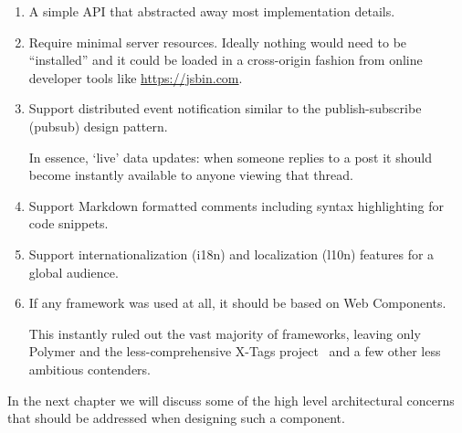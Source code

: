 \begin{enumerate}
\item A simple API that abstracted away most implementation details.\label{motive:abstraction}

\item Require minimal server resources. Ideally nothing would need to be ``installed'' and it could be loaded in a cross-origin fashion from online developer tools like \url{https://jsbin.com}.
\label{motive:cors}

\item Support distributed event notification similar to the 
publish-subscribe (pubsub) design pattern.\label{motive:pubsub}

In essence, `live' data updates:
when someone replies to a post it should become instantly available to anyone viewing that thread.

\item Support Markdown formatted comments including syntax highlighting for code snippets.\label{motive:markdown}

\item Support 
internationalization
(i18n) and 
localization (l10n) features for a global audience.\label{motive:i18n}

\item If any framework was used at all, it should be based on Web Components.\label{motive:webcomponents} 

This instantly ruled out the vast majority of frameworks, 
leaving only Polymer and the less-comprehensive X-Tags project~\cite{x-tagscontributors2015} and a few other less ambitious contenders.

\end{enumerate}

In the next chapter we will discuss some of the high level architectural concerns that should be addressed when designing such a component.
 